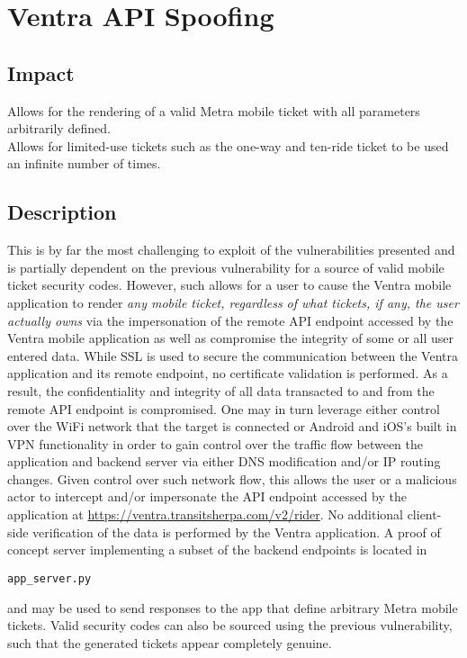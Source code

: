 \documentclass[12pt,conference]{IEEEtran}
\begin{document}
\section{Ventra API Spoofing}

\subsection{Impact}
Allows for the rendering of a valid Metra mobile ticket with all parameters arbitrarily defined.\\
Allows for limited-use tickets such as the one-way and ten-ride ticket to be used an infinite number of times.

\subsection{Description}
This is by far the most challenging to exploit of the vulnerabilities presented and is partially dependent on the previous vulnerability for a source of valid mobile ticket security codes. However, such allows for a user to cause the Ventra mobile application to render \emph{any mobile ticket, regardless of what tickets, if any, the user actually owns} via the impersonation of the remote API endpoint accessed by the Ventra mobile application as well as compromise the integrity of some or all user entered data. While SSL is used to secure the communication between the Ventra application and its remote endpoint, no certificate validation is performed. As a result, the confidentiality and integrity of all data transacted to and from the remote API endpoint is compromised. One may in turn leverage either control over the WiFi network that the target is connected or Android and iOS's built in VPN functionality in order to gain control over the traffic flow between the application and backend server via either DNS modification and/or IP routing changes. Given control over such network flow, this allows the user or a malicious actor to intercept and/or impersonate the API endpoint accessed by the application at \url{https://ventra.transitsherpa.com/v2/rider}. No additional client-side verification of the data is performed by the Ventra application. A proof of concept server implementing a subset of the backend endpoints is located in
\begin{lstlisting}
app_server.py
\end{lstlisting}
and may be used to send responses to the app that define arbitrary Metra mobile tickets. Valid security codes can also be sourced using the previous vulnerability, such that the generated tickets appear completely genuine.
\end{document}
